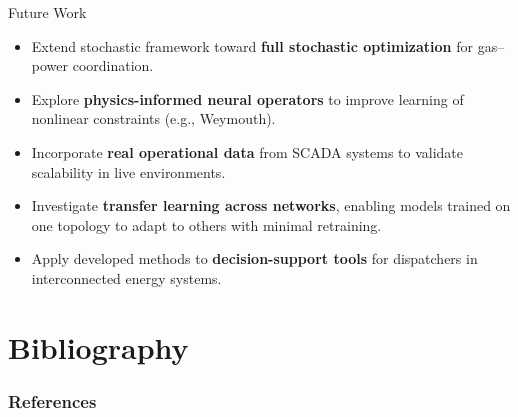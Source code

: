 \documentclass[hyperref={colorlinks,citecolor=blue,linkcolor=blue,urlcolor=blue}]{beamer}
\begin{document}
\begin{frame}{Future Work}
    \begin{itemize}
        \item Extend stochastic framework toward \textbf{full stochastic optimization} for gas–power coordination.
        \item Explore \textbf{physics-informed neural operators} to improve learning of nonlinear constraints (e.g., Weymouth).
        \item Incorporate \textbf{real operational data} from SCADA systems to validate scalability in live environments.
        \item Investigate \textbf{transfer learning across networks}, enabling models trained on one topology to adapt to others with minimal retraining.
        \item Apply developed methods to \textbf{decision-support tools} for dispatchers in interconnected energy systems.
    \end{itemize}
\end{frame}

\section{Bibliography}
\begin{frame}[allowframebreaks]
        \frametitle{References}
        
        
\end{frame}
\end{document}

